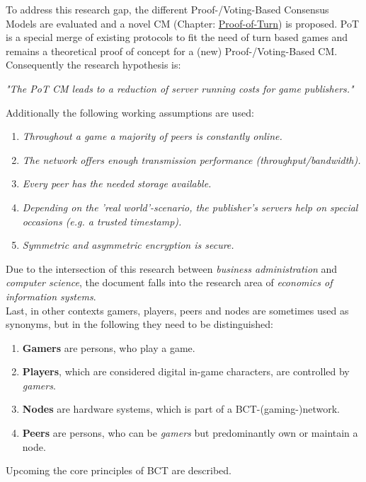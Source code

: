 To address this research gap, the different Proof-/Voting-Based Consensus Models are evaluated and
a novel \gls{CM} (Chapter: \hyperref[chap:PoT]{Proof-of-Turn}) is proposed.
\gls{PoT} is a special merge of existing protocols to fit the need of turn based games and
remains a theoretical proof of concept for a (new) Proof-/Voting-Based \gls{CM}.
Consequently the research hypothesis is:
\begin{center}
	\textit{"The \gls{PoT} \gls{CM} leads to a reduction of server running costs for game publishers."}
\end{center}
Additionally the following working assumptions are used:
\begin{enumerate}
	\item \textit{Throughout a game a majority of peers is constantly online.}
	\item \textit{The network offers enough transmission performance (throughput/bandwidth).}
	\item \textit{Every peer has the needed storage available.}
	\item \textit{Depending on the 'real world'-scenario, the publisher's servers help on special \\
		occasions (e.g. a trusted timestamp).}
	\item \textit{Symmetric and asymmetric encryption is secure.}
\end{enumerate}
Due to the intersection of this research between \textit{business administration} and \textit{computer science},
the document falls into the research area of \textit{economics of information systems}. \\
Last, in other contexts gamers, players, peers and nodes are sometimes used as synonyms,
but in the following they need to be distinguished:
\begin{enumerate}
	\item \textbf{Gamers} are persons, who play a game.
	\item \textbf{Players}, which are considered digital in-game characters, are controlled by \textit{gamers}.
	\item \textbf{Nodes} are hardware systems, which is part of a \gls {BCT}-(gaming-)network.
	\item \textbf{Peers} are persons, who can be \textit{gamers} but predominantly own or maintain a node.
\end{enumerate}
Upcoming the core principles of \gls{BCT} are described.


